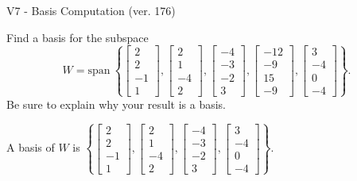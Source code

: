 \begin{exercise}
  \begin{exerciseTitle}V7 - Basis Computation (ver. 176)\end{exerciseTitle}
  \begin{exerciseStatement}
    Find a basis for the subspace 
\[W=\mathrm{span}\ \left\{\left[\begin{array}{r}
2 \\
2 \\
-1 \\
1
\end{array}\right] , \left[\begin{array}{r}
2 \\
1 \\
-4 \\
2
\end{array}\right] , \left[\begin{array}{r}
-4 \\
-3 \\
-2 \\
3
\end{array}\right] , \left[\begin{array}{r}
-12 \\
-9 \\
15 \\
-9
\end{array}\right] , \left[\begin{array}{r}
3 \\
-4 \\
0 \\
-4
\end{array}\right]\right\}.\]
 Be sure to explain why your result is a basis.


  \end{exerciseStatement}
  \begin{exerciseAnswer}
   A basis of \(W\) is  \(\left\{\left[\begin{array}{r}
2 \\
2 \\
-1 \\
1
\end{array}\right] , \left[\begin{array}{r}
2 \\
1 \\
-4 \\
2
\end{array}\right] , \left[\begin{array}{r}
-4 \\
-3 \\
-2 \\
3
\end{array}\right] , \left[\begin{array}{r}
3 \\
-4 \\
0 \\
-4
\end{array}\right]\right\}\).
  


  \end{exerciseAnswer}
\end{exercise}